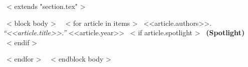 ~< extends "section.tex" >~

~< block body >~
  ~< for article in items >~
    <<article.authors>>. {\it``<<article.title>>.''} <<article.year>>
    ~< if article.spotlight >~
      {\bf {\color{red}(Spotlight)}}
    ~< endif >~

  ~< endfor >~
~< endblock body >~